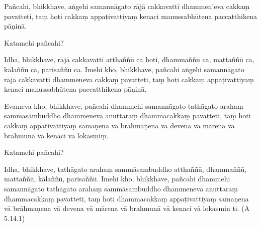 Pañcahi, bhikkhave, aṅgehi samannāgato rājā cakkavattī dhammen’eva cakkaṃ pavatteti, taṃ hoti cakkaṃ appaṭivattiyaṃ kenaci manussabhūtena paccatthikena pāṇinā.

Katamehi pañcahi?

Idha, bhikkhave, rājā cakkavattī atthaññū ca hoti, dhammaññū ca, mattaññū ca, kālaññū ca, parisaññū ca. Imehi kho, bhikkhave, pañcahi aṅgehi samannāgato rājā cakkavattī dhammeneva cakkaṃ pavatteti, taṃ hoti cakkaṃ appaṭivattiyaṃ kenaci manussabhūtena paccatthikena pāṇinā.

Evameva kho, bhikkhave, pañcahi dhammehi samannāgato tathāgato arahaṃ sammāsambuddho dhammeneva anuttaraṃ dhammacakkaṃ pavatteti, taṃ hoti cakkaṃ appaṭivattiyaṃ samaṇena vā brāhmaṇena vā devena vā mārena vā brahmunā vā kenaci vā lokasmiṃ.

Katamehi pañcahi?

Idha, bhikkhave, tathāgato arahaṃ sammāsambuddho atthaññū, dhammaññū, mattaññū, kālaññū, parisaññū. Imehi kho, bhikkhave, pañcahi dhammehi samannāgato tathāgato arahaṃ sammāsambuddho dhammeneva anuttaraṃ dhammacakkaṃ pavatteti, taṃ hoti dhammacakkaṃ appaṭivattiyaṃ samaṇena vā brāhmaṇena vā devena vā mārena vā brahmunā vā kenaci vā lokasmin ti. (A 5.14.1)